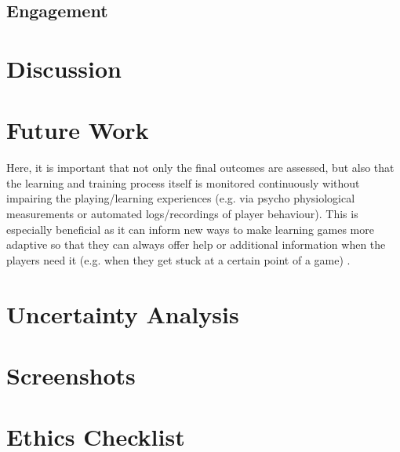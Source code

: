 \documentclass[a4paper,11.5pt]{report}
\numberwithin{figure}{section}
\numberwithin{table}{section}
\numberwithin{equation}{section}
\numberwithin{equation}{section}
\newcommand\blankpage{%
    \null
    \thispagestyle{empty}%
    \addtocounter{page}{-1}%
    \newpage}
\begin{document}
\section{Engagement}

\afterpage{\blankpage}




\chapter{Discussion}
\afterpage{\blankpage}



\chapter{Future Work}

Here, it is important that not only the final outcomes are assessed, but also that the learning and training process itself is monitored continuously without impairing the playing/learning experiences (e.g. via psycho physiological measurements or automated logs/recordings of player behaviour). This is especially beneficial as it can inform new ways to make learning games more adaptive so that they can always offer help or additional information when the players need it (e.g. when they get stuck at a certain point of a game) \citep{Breuer2010}.

\afterpage{\blankpage}





\appendix
{}
\appendixpage

\renewcommand\chaptername{Appendix}

\newpage
\chapter{Uncertainty Analysis} \label{app:errors}

\chapter{Screenshots} \label{app:screenshots}

\chapter{Ethics Checklist} \label{app:ethicschecklist}
\end{document}
